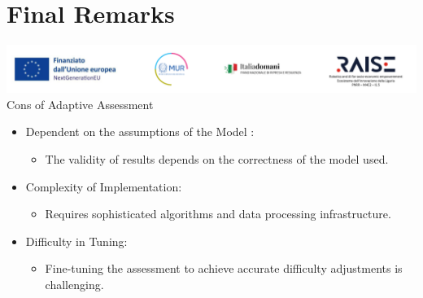\documentclass{beamer}
\begin{document}
\section{Final Remarks}

\begin{frame}{\includegraphics[scale=0.4]{Da_cambiare.png} \\ 
Cons of Adaptive Assessment}
\small
\begin{itemize}
    \item Dependent on the assumptions of the Model :
    \begin{itemize}
        \item The validity of results depends on the correctness of the model used.\\ 
    
    \end{itemize}
     \vspace{.3 cm}
    \item  Complexity of Implementation:
    \begin{itemize}
        \item Requires sophisticated algorithms and data processing infrastructure.
    
    \end{itemize}
     \vspace{.3 cm}
    \item Difficulty in Tuning:
    \begin{itemize}
        \item Fine-tuning the assessment to achieve accurate difficulty adjustments is challenging.
    \end{itemize}
\end{itemize}
\end{frame}
\end{document}

